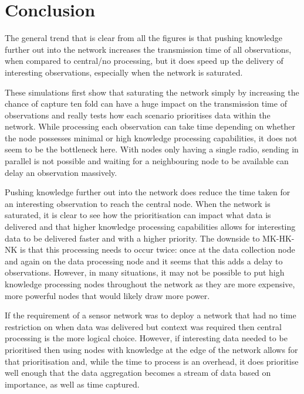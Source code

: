 \section{Conclusion}\label{sim:conc}
The general trend that is clear from all the figures is that pushing knowledge further out into the network increases the transmission time of all observations, when compared to central/no processing, but it does speed up the delivery of interesting observations, especially when the network is saturated.

These simulations first show that saturating the network simply by increasing the chance of capture ten fold can have a huge impact on the transmission time of observations and really tests how each scenario prioritises data within the network. While processing each observation can take time depending on whether the node possesses minimal or high knowledge processing capabilities, it does not seem to be the bottleneck here. With nodes only having a single radio, sending in parallel is not possible and waiting for a neighbouring node to be available can delay an observation massively.

Pushing knowledge further out into the network does reduce the time taken for an interesting observation to reach the central node. When the network is saturated, it is clear to see how the prioritisation can impact what data is delivered and that higher knowledge processing capabilities allows for interesting data to be delivered faster and with a higher priority. The downside to MK-HK-NK is that this processing needs to occur twice: once at the data collection node and again on the data processing node and it seems that this adds a delay to observations. However, in many situations, it may not be possible to put high knowledge processing nodes throughout the network as they are more expensive, more powerful nodes that would likely draw more power.

If the requirement of a sensor network was to deploy a network that had no time restriction on when data was delivered but context was required then central processing is the more logical choice. However, if interesting data needed to be prioritised then using nodes with knowledge at the edge of the network allows for that prioritisation and, while the time to process is an overhead, it does prioritise well enough that the data aggregation becomes a stream of data based on importance, as well as time captured.



	
